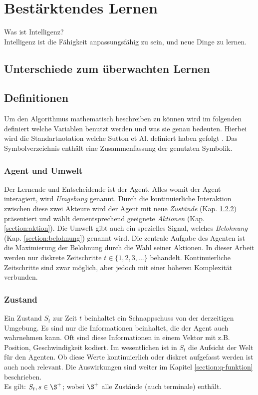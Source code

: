 \documentclass[a4paper,titlepage]{article}
\numberwithin{equation}{section} %
\begin{document}

\section{Bestärktendes Lernen}
Was ist Intelligenz? \\
Intelligenz ist die Fähigkeit anpassungsfähig zu sein, und neue Dinge zu lernen.


\subsection{Unterschiede zum überwachten Lernen}

\subsection{Definitionen}
Um den Algorithmus mathematisch beschreiben zu können wird im folgenden definiert welche Variablen benutzt werden und
was sie genau bedeuten. Hierbei wird die Standartnotation welche Sutton et Al. definiert haben gefolgt \cite{suttonReinforcementLearningIntroduction2018}.
Das Symbolverzeichnis enthält eine Zusammenfassung der genutzten Symbolik.

\subsubsection{Agent und Umwelt}
Der Lernende und Entscheidende ist der Agent. Alles womit der Agent interagiert, wird \emph{Umgebung} genannt. Durch die kontinuierliche Interaktion zwischen diese zwei Akteure wird der Agent mit neue \emph{Zustände} (Kap. \ref{section:zustand}) präsentiert und wählt dementsprechend geeignete \emph{Aktionen} (Kap. \ref{section:aktion}). Die Umwelt gibt auch ein spezielles Signal, welches \emph{Belohnung} (Kap. \ref{section:belohnung}) genannt wird. Die zentrale Aufgabe des Agenten ist die Maximierung der Belohnung durch die Wahl seiner Aktionen. In dieser Arbeit werden nur diskrete Zeitschritte $t \in \{1, 2, 3, ...\}$ behandelt. Kontinuierliche Zeitschritte sind zwar möglich, aber jedoch mit einer höheren Komplexität verbunden.

\subsubsection{Zustand} \label{section:zustand}
Ein Zustand $S_{t}$ zur Zeit $t$ beinhaltet ein Schnappschuss von der derzeitigen Umgebung. Es sind nur die Informationen beinhaltet, die der Agent auch wahrnehmen kann. Oft sind diese Informationen in einem Vektor mit z.B. Position, Geschwindigkeit kodiert. Im wesentlichen ist in $S_{t}$ die Aufsicht der Welt für den Agenten. Ob diese Werte kontinuierlich oder diskret aufgefasst werden ist auch noch relevant. Die Auswirkungen sind weiter im Kapitel \ref{section:q-funktion} beschrieben. \\
Es gilt: $S_{t}, s \in \S^{+}$; wobei $\S^{+}$ alle Zustände (auch terminale) enthält.
\end{document}
